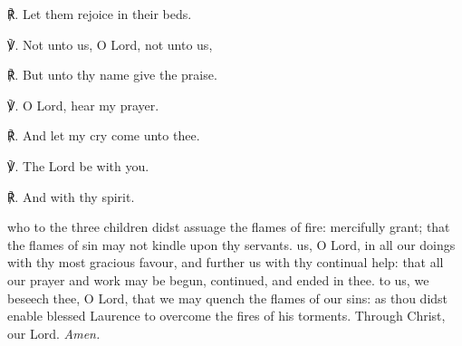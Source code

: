 \begin{multicols}{2}
℟. Let them rejoice in their beds.

℣. Not unto us, O Lord, not unto us,

℟. But unto thy name give the praise.

℣. O Lord, hear my prayer.

℟. And let my cry come unto thee.

℣. The Lord be with you.

℟. And with thy spirit.

{} who to the three children didst assuage the flames of fire: mercifully grant; that the flames of sin may not kindle upon thy servants.
 us, O Lord, in all our doings with thy most gracious favour, and further us with thy continual help: that all our prayer and work may be begun, continued, and ended in thee.
 to us, we beseech thee, O Lord, that we may quench the flames of our sins: as thou didst enable blessed Laurence to overcome the fires of his torments. Through Christ, our Lord. \textit{Amen.}
\end{multicols}